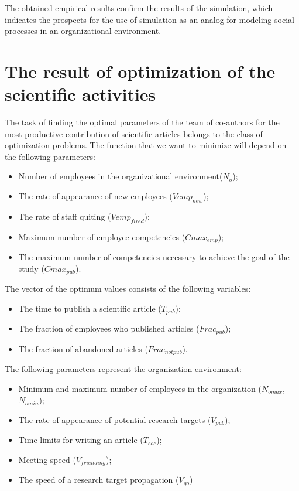 \documentclass[12pt]{report}
\theoremstyle{definition}
\providecommand{\tightlist}{%
	\setlength{\itemsep}{0pt}\setlength{\parskip}{0pt}}
\begin{document}
The obtained empirical results confirm the results of the simulation, which indicates the prospects for the use of simulation as an analog for modeling social processes in an organizational environment.

\section{The result of optimization of the scientific activities}
\label{sec:scrum}
The task of finding the optimal parameters of the team of co-authors for the most productive contribution of scientific articles belongs to the class of optimization problems. 
The function that we want to minimize will depend on the following parameters:
\begin{itemize}
	\tightlist
	\item
	Number of employees in the organizational environment($N_{o}$);
	\item
	The rate of appearance of new employees ($Vemp_{new}$);
	\item
	The rate of staff quiting ($Vemp_{fired}$);
	\item
	Maximum number of employee competencies ($Cmax_{emp}$);
	\item
	The maximum number of competencies necessary to achieve the goal of the study ($Cmax_{pub}$).
\end{itemize}

The vector of the optimum values consists of the following variables:

\begin{itemize}
	\tightlist
	\item
	The time to publish a scientific article ($T_{pub}$);
	\item
	The fraction of employees who published articles ($Frac_{pub}$);
	\item
	The fraction of abandoned articles ($Frac_{notpub}$).
\end{itemize}

The following parameters represent the organization environment:

\begin{itemize}
	\tightlist
	\item
	Minimum and maximum number of employees in the organization	($N_{omax}$,$N_{omin}$);
	\item
	The rate of appearance of potential research targets ($V_{pub}$);
	\item
	Time limits for writing an article ($T_{eoc}$);
	\item
	Meeting speed ($V_{friending}$);
	\item
	The speed of a research target propagation ($V_{go}$)
\end{itemize}
\end{document}

